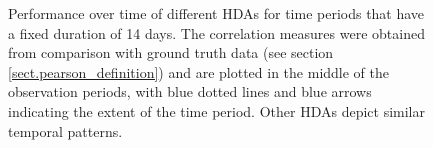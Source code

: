 \documentclass[a4paper]{article}
\begin{document}
\begin{figure}[htpb!]
\centering
\caption{Performance over time of different HDAs for time periods that have a fixed duration of 14 days. The correlation measures were obtained from comparison with ground truth data (see section \ref{sect.pearson_definition}) and are plotted in the middle of the observation periods, with blue dotted lines and blue arrows indicating the extent of the time period. Other HDAs depict similar temporal patterns.}
\label{fig:corr_temporality}
\end{figure}
\end{document}
